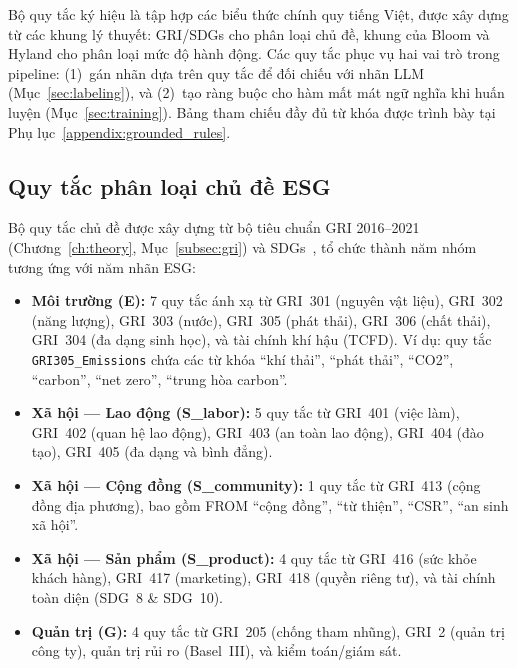 Bộ quy tắc ký hiệu là tập hợp các biểu thức chính quy tiếng Việt, được xây dựng từ các khung lý thuyết: GRI/SDGs cho phân loại chủ đề, khung của Bloom và Hyland cho phân loại mức độ hành động. Các quy tắc phục vụ hai vai trò trong pipeline: (1)~gán nhãn dựa trên quy tắc để đối chiếu với nhãn LLM (Mục~\ref{sec:labeling}), và (2)~tạo ràng buộc cho hàm mất mát ngữ nghĩa khi huấn luyện (Mục~\ref{sec:training}). Bảng tham chiếu đầy đủ từ khóa được trình bày tại Phụ lục~\ref{appendix:grounded_rules}.


\subsection{Quy tắc phân loại chủ đề ESG}
\label{subsec:topic_rules}

Bộ quy tắc chủ đề được xây dựng từ bộ tiêu chuẩn GRI 2016--2021 (Chương~\ref{ch:theory}, Mục~\ref{subsec:gri}) và SDGs~\cite{un_sdgs_2015}, tổ chức thành năm nhóm tương ứng với năm nhãn ESG:

\begin{itemize}
    \item \textbf{Môi trường (E):} 7 quy tắc ánh xạ từ GRI~301 (nguyên vật liệu), GRI~302 (năng lượng), GRI~303 (nước), GRI~305 (phát thải), GRI~306 (chất thải), GRI~304 (đa dạng sinh học), và tài chính khí hậu (TCFD). Ví dụ: quy tắc \texttt{GRI305\_Emissions} chứa các từ khóa ``khí thải'', ``phát thải'', ``CO2'', ``carbon'', ``net zero'', ``trung hòa carbon''.

    \item \textbf{Xã hội --- Lao động (S\_labor):} 5 quy tắc từ GRI~401 (việc làm), GRI~402 (quan hệ lao động), GRI~403 (an toàn lao động), GRI~404 (đào tạo), GRI~405 (đa dạng và bình đẳng).

    \item \textbf{Xã hội --- Cộng đồng (S\_community):} 1 quy tắc từ GRI~413 (cộng đồng địa phương), bao gồm FROM ``cộng đồng'', ``từ thiện'', ``CSR'', ``an sinh xã hội''.

    \item \textbf{Xã hội --- Sản phẩm (S\_product):} 4 quy tắc từ GRI~416 (sức khỏe khách hàng), GRI~417 (marketing), GRI~418 (quyền riêng tư), và tài chính toàn diện (SDG~8 \& SDG~10).

    \item \textbf{Quản trị (G):} 4 quy tắc từ GRI~205 (chống tham nhũng), GRI~2 (quản trị công ty), quản trị rủi ro (Basel~III), và kiểm toán/giám sát.
\end{itemize}

